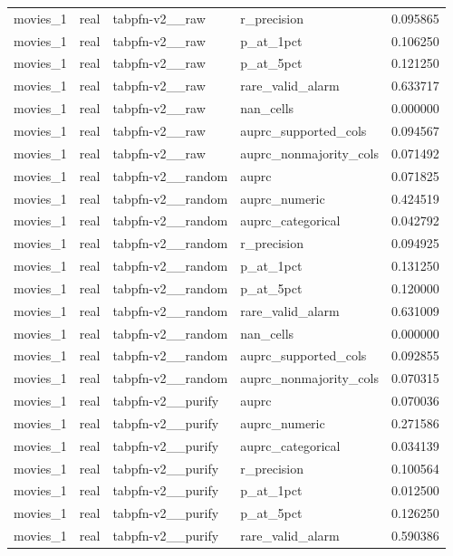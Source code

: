 \begin{tabular}{lllll}
movies\_1 & real & tabpfn-v2\_\_raw & r\_precision & 0.095865 \\
movies\_1 & real & tabpfn-v2\_\_raw & p\_at\_1pct & 0.106250 \\
movies\_1 & real & tabpfn-v2\_\_raw & p\_at\_5pct & 0.121250 \\
movies\_1 & real & tabpfn-v2\_\_raw & rare\_valid\_alarm & 0.633717 \\
movies\_1 & real & tabpfn-v2\_\_raw & nan\_cells & 0.000000 \\
movies\_1 & real & tabpfn-v2\_\_raw & auprc\_supported\_cols & 0.094567 \\
movies\_1 & real & tabpfn-v2\_\_raw & auprc\_nonmajority\_cols & 0.071492 \\
movies\_1 & real & tabpfn-v2\_\_random & auprc & 0.071825 \\
movies\_1 & real & tabpfn-v2\_\_random & auprc\_numeric & 0.424519 \\
movies\_1 & real & tabpfn-v2\_\_random & auprc\_categorical & 0.042792 \\
movies\_1 & real & tabpfn-v2\_\_random & r\_precision & 0.094925 \\
movies\_1 & real & tabpfn-v2\_\_random & p\_at\_1pct & 0.131250 \\
movies\_1 & real & tabpfn-v2\_\_random & p\_at\_5pct & 0.120000 \\
movies\_1 & real & tabpfn-v2\_\_random & rare\_valid\_alarm & 0.631009 \\
movies\_1 & real & tabpfn-v2\_\_random & nan\_cells & 0.000000 \\
movies\_1 & real & tabpfn-v2\_\_random & auprc\_supported\_cols & 0.092855 \\
movies\_1 & real & tabpfn-v2\_\_random & auprc\_nonmajority\_cols & 0.070315 \\
movies\_1 & real & tabpfn-v2\_\_purify & auprc & 0.070036 \\
movies\_1 & real & tabpfn-v2\_\_purify & auprc\_numeric & 0.271586 \\
movies\_1 & real & tabpfn-v2\_\_purify & auprc\_categorical & 0.034139 \\
movies\_1 & real & tabpfn-v2\_\_purify & r\_precision & 0.100564 \\
movies\_1 & real & tabpfn-v2\_\_purify & p\_at\_1pct & 0.012500 \\
movies\_1 & real & tabpfn-v2\_\_purify & p\_at\_5pct & 0.126250 \\
movies\_1 & real & tabpfn-v2\_\_purify & rare\_valid\_alarm & 0.590386 \\

\end{tabular}
